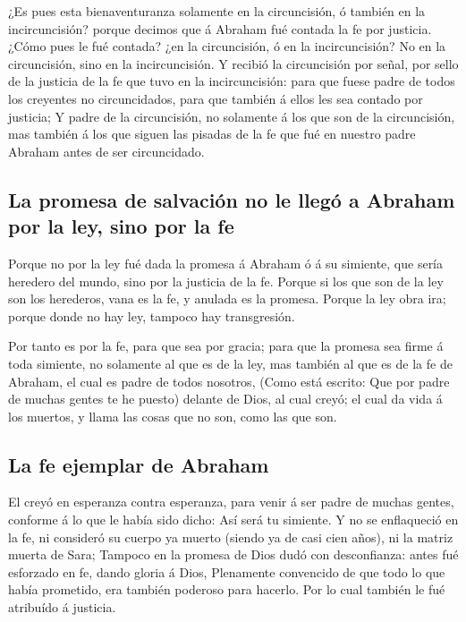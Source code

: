  ¿Es pues esta bienaventuranza solamente en la circuncisión,
ó también en la incircuncisión? porque decimos que á Abraham fué contada
la fe por justicia.  ¿Cómo pues le fué contada? ¿en la
circuncisión, ó en la incircuncisión? No en la circuncisión, sino en la
incircuncisión.  Y recibió la circuncisión por señal, por
sello de la justicia de la fe que tuvo en la incircuncisión: para que
fuese padre de todos los creyentes no circuncidados, para que también á
ellos les sea contado por justicia;  Y padre de la
circuncisión, no solamente á los que son de la circuncisión, mas también
á los que siguen las pisadas de la fe que fué en nuestro padre Abraham
antes de ser circuncidado.

\hypertarget{la-promesa-de-salvaciuxf3n-no-le-lleguxf3-a-abraham-por-la-ley-sino-por-la-fe}{%
\subsection{La promesa de salvación no le llegó a Abraham por la ley,
sino por la
fe}\label{la-promesa-de-salvaciuxf3n-no-le-lleguxf3-a-abraham-por-la-ley-sino-por-la-fe}}

 Porque no por la ley fué dada la promesa á Abraham ó á su
simiente, que sería heredero del mundo, sino por la justicia de la fe.
 Porque si los que son de la ley son los herederos, vana es
la fe, y anulada es la promesa.  Porque la ley obra ira;
porque donde no hay ley, tampoco hay transgresión.

 Por tanto es por la fe, para que sea por gracia; para que
la promesa sea firme á toda simiente, no solamente al que es de la ley,
mas también al que es de la fe de Abraham, el cual es padre de todos
nosotros,  (Como está escrito: Que por padre de muchas
gentes te he puesto) delante de Dios, al cual creyó; el cual da vida á
los muertos, y llama las cosas que no son, como las que son.

\hypertarget{la-fe-ejemplar-de-abraham}{%
\subsection{La fe ejemplar de Abraham}\label{la-fe-ejemplar-de-abraham}}

 El creyó en esperanza contra esperanza, para venir á ser
padre de muchas gentes, conforme á lo que le había sido dicho: Así será
tu simiente.  Y no se enflaqueció en la fe, ni consideró su
cuerpo ya muerto (siendo ya de casi cien años), ni la matriz muerta de
Sara;  Tampoco en la promesa de Dios dudó con desconfianza:
antes fué esforzado en fe, dando gloria á Dios,  Plenamente
convencido de que todo lo que había prometido, era también poderoso para
hacerlo.  Por lo cual también le fué atribuído á justicia.

